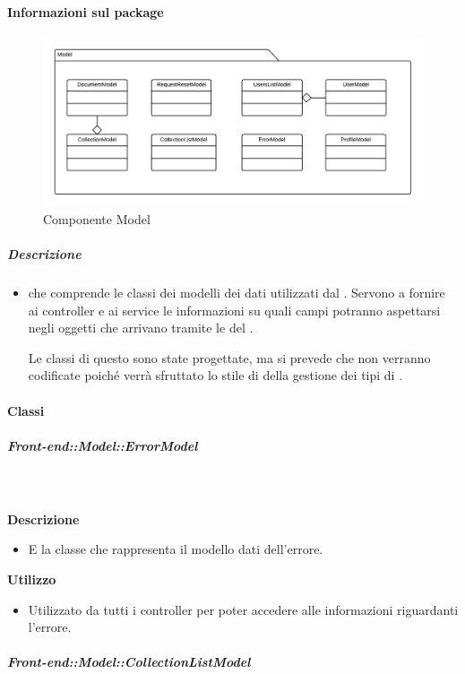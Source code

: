   \paragraph{Informazioni sul package}
    \begin{figure}[H] 
      \begin{center} 
        \includegraphics[width=\textwidth]{uml/package/Front-end::Model.png}  
        \caption{Componente Model}
      \end{center}  
    \end{figure} 
  \subparagraph{Descrizione} 
    \begin{itemize}
    \item[]  che comprende le classi dei modelli dei dati utilizzati dal . Servono a fornire ai controller e ai service le informazioni su quali campi potranno aspettarsi negli oggetti che arrivano tramite le  del .

Le classi di questo  sono state progettate, ma si prevede che non verranno codificate poiché verrà sfruttato lo stile di  della gestione dei tipi di .
    \end{itemize} 
    \paragraph{Classi}
      \subparagraph{Front-end::Model::ErrorModel}
        
        \textbf{\\ \\ Descrizione} 
          \begin{itemize}
            \item[] E la classe che rappresenta il modello dati dell'errore.
          \end{itemize}      
        \textbf{Utilizzo}  
          \begin{itemize}
            \item[] Utilizzato da tutti i controller per poter accedere alle informazioni riguardanti l'errore.
          \end{itemize}
      \subparagraph{Front-end::Model::CollectionListModel}
        
